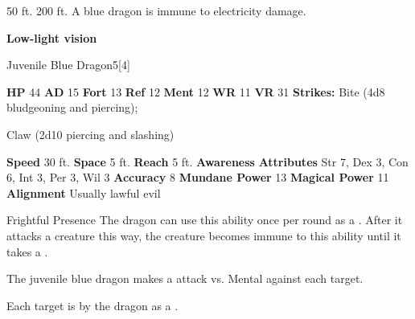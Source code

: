       
       50 ft.
     200 ft.
     A blue dragon is immune to electricity damage.
    \par\noindent\textbf{Low-light vision}
  

  \begin{monsubsection}{Juvenile Blue Dragon}{5}[4]
    \vspace{-1em}\vspace{-1em}
    \vspace{0em}

    
    

    \begin{spellcontent}
      \begin{spelltargetinginfo}
        \pari \textbf{HP} 44 \monsep
          \textbf{AD} 15 \monsep
          \textbf{Fort} 13 \monsep
          \textbf{Ref} 12 \monsep
          \textbf{Ment} 12
        \pari \textbf{WR} 11 \monsep
        \textbf{VR} 31
        \pari \textbf{Strikes:}
            Bite  (4d8 bludgeoning and piercing);
\par Claw  (2d10 piercing and slashing)
      \end{spelltargetinginfo}
    \end{spellcontent}
    \begin{monsterfooter}
      \pari \textbf{Speed} 30 ft. \monsep
        \textbf{Space} 5 ft. \monsep
        \textbf{Reach} 5 ft.
      \pari \textbf{Awareness} 
      \pari \textbf{Attributes}
        Str 7, Dex 3,
        Con 6, Int 3,
        Per 3, Wil 3
      \pari \textbf{Accuracy} 8 \monsep
        \textbf{Mundane Power} 13 \monsep
      \textbf{Magical Power} 11
      \pari \textbf{Alignment} Usually lawful evil
    \end{monsterfooter}
  \end{monsubsection}
  \begin{freeability}{Frightful Presence}
      The dragon can use this ability once per round as a .
      After it attacks a creature this way, the creature becomes immune to this ability until it takes a .
      \par The juvenile blue dragon makes a  attack
        vs. Mental against each target.
    
    \hit Each target is  by the dragon as a .
    \end{freeability}
  

